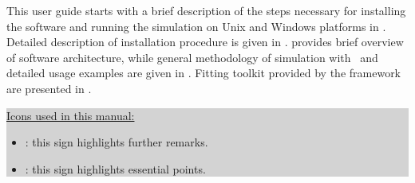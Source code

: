 
This user guide starts with a brief description of the steps necessary for 
installing the software and running the simulation 
on Unix and Windows platforms in .
Detailed description of installation procedure is given in .
 provides brief overview of software architecture,
while general methodology of simulation with \BornAgain\ and detailed usage examples are given in .
Fitting toolkit provided by the framework are presented in .



\vspace*{2mm}

\colorbox{Lightgray}{\parbox{0.95\linewidth}
{
\noindent \underline{Icons used in this manual:}
\begin{itemize}
\item[] \smallpencil: this sign highlights further remarks.
\item[] {\huge\danger}: this sign highlights essential points.
\end{itemize}
}
}
